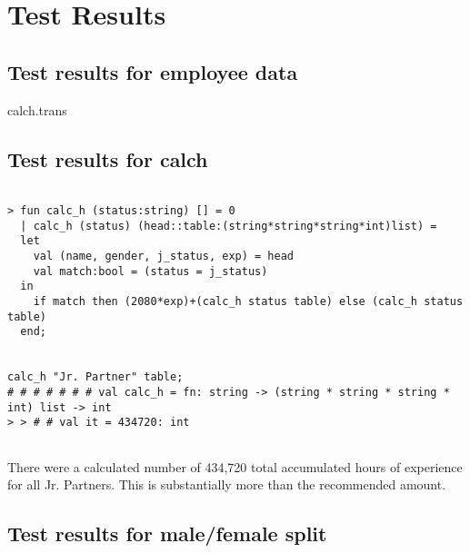 \documentclass{report}
\begin{document}
\section{Test Results}
\label{sec:tests}


\subsection{Test results for employee data}
\label{sec:test-results-empl-1}

\setcounter{sessioncount}{0}

 {calch.trans}


\subsection{Test results for calch}
\label{sec:test-results-calch}

\begin{session}
  \begin{scriptsize}
\begin{verbatim}

> fun calc_h (status:string) [] = 0
  | calc_h (status) (head::table:(string*string*string*int)list) =
  let
    val (name, gender, j_status, exp) = head
    val match:bool = (status = j_status)
  in
    if match then (2080*exp)+(calc_h status table) else (calc_h status table)
  end;


calc_h "Jr. Partner" table;
# # # # # # # val calc_h = fn: string -> (string * string * string * int) list -> int
> > # # val it = 434720: int


\end{verbatim}
  \end{scriptsize}
\end{session}

There were a calculated number of 434,720 total accumulated hours of experience for all Jr. Partners.
This is substantially more than the recommended amount.

\subsection{Test results for male/female split}
\label{sec:test-results-malef}
\end{document}
